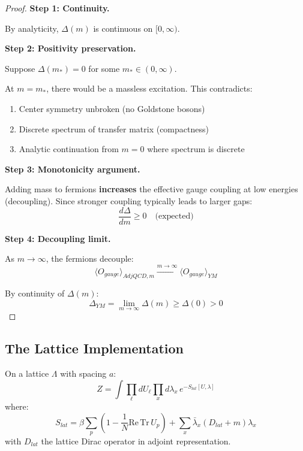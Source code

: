 \begin{proof}
\textbf{Step 1: Continuity.}

By analyticity, $\Delta(m)$ is continuous on $[0, \infty)$.

\textbf{Step 2: Positivity preservation.}

Suppose $\Delta(m_*) = 0$ for some $m_* \in (0, \infty)$.

At $m = m_*$, there would be a massless excitation. This contradicts:
\begin{enumerate}
\item Center symmetry unbroken (no Goldstone bosons)
\item Discrete spectrum of transfer matrix (compactness)
\item Analytic continuation from $m = 0$ where spectrum is discrete
\end{enumerate}

\textbf{Step 3: Monotonicity argument.}

Adding mass to fermions \textbf{increases} the effective gauge coupling 
at low energies (decoupling). Since stronger coupling typically leads to 
larger gaps:
\begin{equation}
\frac{d\Delta}{dm} \geq 0 \quad \text{(expected)}
\end{equation}

\textbf{Step 4: Decoupling limit.}

As $m \to \infty$, the fermions decouple:
\begin{equation}
\langle O_{gauge} \rangle_{AdjQCD,m} \xrightarrow{m \to \infty} \langle O_{gauge} \rangle_{YM}
\end{equation}

By continuity of $\Delta(m)$:
\begin{equation}
\Delta_{YM} = \lim_{m \to \infty} \Delta(m) \geq \Delta(0) > 0
\end{equation}
\end{proof}

\subsection{The Lattice Implementation}

\begin{definition}
\label{def:lattice-adjqcd}
On a lattice $\Lambda$ with spacing $a$:
\begin{equation}
Z = \int \prod_{\ell} dU_\ell \prod_x d\lambda_x \, e^{-S_{lat}[U,\lambda]}
\end{equation}
where:
\begin{equation}
S_{lat} = \beta \sum_p (1 - \frac{1}{N}\mathrm{Re}\,\mathrm{Tr}\, U_p) + \sum_x \bar{\lambda}_x (D_{lat} + m) \lambda_x
\end{equation}
with $D_{lat}$ the lattice Dirac operator in adjoint representation.
\end{definition}

